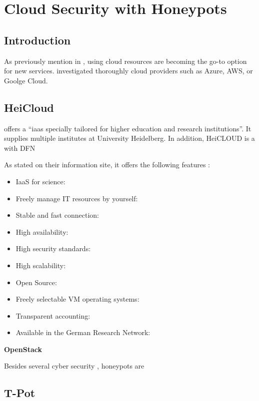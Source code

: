 \chapter{Cloud Security with Honeypots}

\section{Introduction}


As previously mention in , using cloud resources are becoming the go-to option for new services.
\citet{Kelly2021} investigated thoroughly cloud providers such as Azure, AWS, or Goolge Cloud. 


\section{HeiCloud}

\citet{urz2021} offers a \enquote{\ac{iaas} specially tailored for higher education and research institutions}.
It supplies multiple institutes at University Heidelberg.
In addition, HeiCLOUD is a with DFN 

As stated on their information site, it offers the following features \cite{heicloud2021}:

\begin{itemize}
    \item IaaS for science:
    \item Freely manage IT resources by yourself:
    \item Stable and fast connection:
    \item High availability:
    \item High security standards:
    \item High scalability:
    \item Open Source:
    \item Freely selectable VM operating systems:
    \item Transparent accounting:
    \item Available in the German Research Network:
\end{itemize}

\textbf{OpenStack}

Besides several cyber security , honeypots are 

\section{T-Pot}

